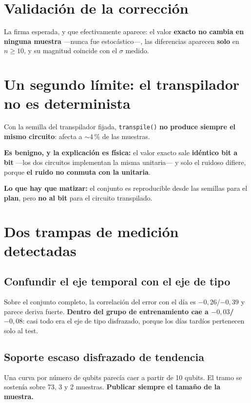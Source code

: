 \section{Validación de la corrección}
\label{sec:validacion}
La firma esperada, y que efectivamente aparece: el valor \textbf{exacto no cambia en ninguna
muestra} —nunca fue estocástico—, las diferencias aparecen \textbf{solo} en $n \geq 10$, y su
magnitud coincide con el $\sigma$ medido.

\section{Un segundo límite: el transpilador no es determinista}
\label{sec:transpilador}
Con la semilla del transpilador fijada, \texttt{transpile()} \textbf{no produce siempre el
mismo circuito}: afecta a $\sim$4\,\% de las muestras.

\textbf{Es benigno, y la explicación es física:} el valor exacto sale \textbf{idéntico bit a
bit} —los dos circuitos implementan la misma unitaria— y solo el ruidoso difiere, porque
\textbf{el ruido no conmuta con la unitaria}.

\textbf{Lo que hay que matizar:} el conjunto es reproducible desde las semillas para el
\textbf{plan}, pero \textbf{no al bit} para el circuito transpilado.

\section{Dos trampas de medición detectadas}
\label{sec:trampas}
\subsection{Confundir el eje temporal con el eje de tipo}
Sobre el conjunto completo, la correlación del error con el día es $-0{,}26$/$-0{,}39$ y
parece deriva fuerte. \textbf{Dentro del grupo de entrenamiento cae a $-0{,}03$/$-0{,}08$}:
casi todo era el eje de tipo disfrazado, porque los días tardíos pertenecen solo al test.

\subsection{Soporte escaso disfrazado de tendencia}
Una curva por número de qubits parecía caer a partir de 10 qubits. El tramo se sostenía sobre
73, 3 y 2 muestras. \textbf{Publicar siempre el tamaño de la muestra.}
